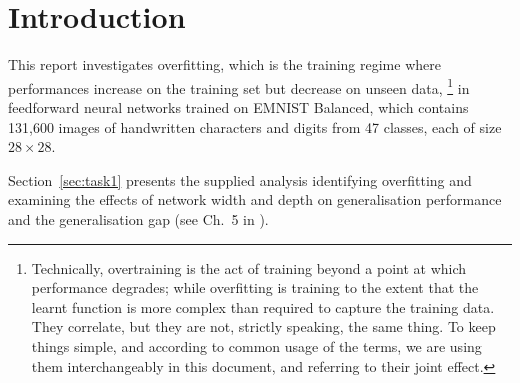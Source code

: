 \documentclass{article}
\begin{document}
 



\begin{abstract} 
This report investigates overfitting in feedforward neural networks
on the EMNIST Balanced dataset. We begin with supplied analyses
of training and validation behaviour and the effects of network
width and depth. We then examine dropout, L1 and L2 weight
penalties, na\"ive elastic net and label smoothing. Using supplied
results and additional experiments, we compare their effects on
validation performance and the generalisation gap, and justify
and evaluate ten further configurations. We select the best
configuration from Tables~3 and~4 using validation results and
evaluate it on the test set. We also independently investigate
an additional regularisation approach from the literature,
comparing its validation results with those of the selected
configuration. Finally, we discuss the findings, limitations
and future directions.

(Please note that a normal Abstract would precisely state what those conclusions were).
\end{abstract} 


\section{Introduction}
\label{sec:intro}

This report investigates overfitting, which is the training regime where performances increase on the training set but decrease on unseen data, \footnote{Technically, overtraining is the act of training beyond a point at which performance degrades; while overfitting is training to the extent that the learnt function is more complex than required to capture the training data. They correlate, but they are not, strictly speaking, the same thing. To keep things simple, and according to common usage of the terms, we are using them interchangeably in this document, and referring to their joint effect.} in feedforward neural
networks trained on EMNIST Balanced, which contains 131,600
images of handwritten characters and digits from 47 classes,
each of size $28 \times 28$.

Section~\ref{sec:task1} presents the supplied analysis identifying
overfitting and examining the effects of network width and depth
on generalisation performance and the generalisation gap
(see Ch.~5 in \citealt{Goodfellow-et-al-2016}).
\end{document}
